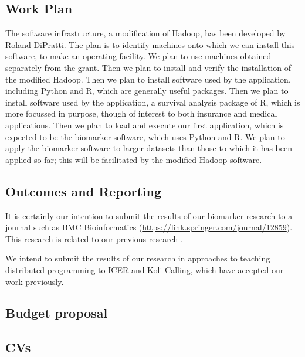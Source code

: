 \documentclass[]{article}
\begin{document}
\subsection{Work Plan}%
The software infrastructure, a modification of Hadoop, has been developed by Roland DiPratti.
The plan is to identify machines onto which we can install this software, to make an operating facility.
We plan to use machines obtained separately from the grant.
Then we plan to install and verify the installation of the modified Hadoop.
Then we plan to install software used by the application, including Python and R, which are generally useful packages.
Then we plan to install software used by the application, a survival analysis package of R, which is more focussed in purpose, though of interest to both insurance and medical applications.
Then we plan to load and execute our first application, which is expected to be the biomarker software, which uses Python and R. 
 We plan to apply the biomarker software to larger datasets than those to which it has been applied so far; this will be facilitated by the modified Hadoop software.
 \subsection{Outcomes and Reporting}
 
 It is certainly our intention to submit the results of our biomarker research to a journal such as BMC Bioinformatics (\url{https://link.springer.com/journal/12859}). This research is related to our previous research \cite{ammar2013developing}.
 
 We intend to submit the results of our research in approaches to teaching distributed programming to ICER and Koli Calling, which have accepted our work previously.
 
 \subsection{Budget proposal}
 
 \subsection{CVs}
\end{document}
